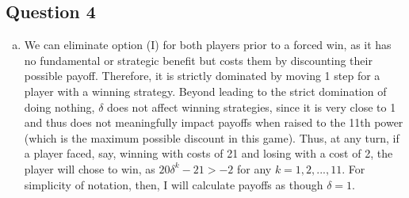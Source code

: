 \documentclass{article}
\begin{document}

\subsection*{Question 4}

\begin{enumerate}[(a)]
	\item We can eliminate option (I) for both players prior to a forced win, as it has no fundamental or strategic benefit but costs them by discounting their possible payoff. Therefore, it is strictly dominated by moving 1 step for a player with a winning strategy. Beyond leading to the strict domination of doing nothing, $\delta$ does not affect winning strategies, since it is very close to 1 and thus does not meaningfully impact payoffs when raised to the 11th power (which is the maximum possible discount in this game). Thus, at any turn, if a player faced, say, winning with costs of 21 and losing with a cost of 2, the player will chose to win, as ${20\delta^k-21>-2}$ for any ${k=1,2,...,11}$. For simplicity of notation, then, I will calculate payoffs as though ${\delta=1}$. 
	

\end{enumerate}
\end{document}
